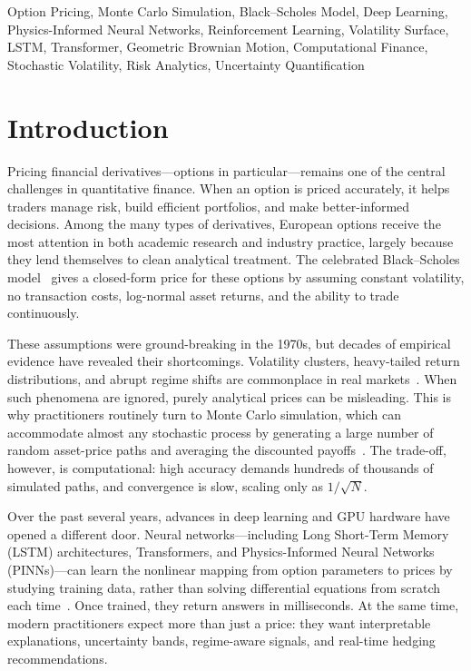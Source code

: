 \documentclass[conference]{IEEEtran}
\begin{document}
\begin{IEEEkeywords}
Option Pricing, Monte Carlo Simulation, Black--Scholes Model, Deep Learning, Physics-Informed Neural Networks, Reinforcement Learning, Volatility Surface, LSTM, Transformer, Geometric Brownian Motion, Computational Finance, Stochastic Volatility, Risk Analytics, Uncertainty Quantification
\end{IEEEkeywords}

\section{Introduction}

Pricing financial derivatives---options in particular---remains one of the central challenges in quantitative finance. When an option is priced accurately, it helps traders manage risk, build efficient portfolios, and make better-informed decisions. Among the many types of derivatives, European options receive the most attention in both academic research and industry practice, largely because they lend themselves to clean analytical treatment. The celebrated Black--Scholes model~\cite{b1} gives a closed-form price for these options by assuming constant volatility, no transaction costs, log-normal asset returns, and the ability to trade continuously.

These assumptions were ground-breaking in the 1970s, but decades of empirical evidence have revealed their shortcomings. Volatility clusters, heavy-tailed return distributions, and abrupt regime shifts are commonplace in real markets~\cite{b2,b3}. When such phenomena are ignored, purely analytical prices can be misleading. This is why practitioners routinely turn to Monte Carlo simulation, which can accommodate almost any stochastic process by generating a large number of random asset-price paths and averaging the discounted payoffs~\cite{b4}. The trade-off, however, is computational: high accuracy demands hundreds of thousands of simulated paths, and convergence is slow, scaling only as $1/\sqrt{N}$.

Over the past several years, advances in deep learning and GPU hardware have opened a different door. Neural networks---including Long Short-Term Memory (LSTM) architectures, Transformers, and Physics-Informed Neural Networks (PINNs)---can learn the nonlinear mapping from option parameters to prices by studying training data, rather than solving differential equations from scratch each time~\cite{b5,b6}. Once trained, they return answers in milliseconds. At the same time, modern practitioners expect more than just a price: they want interpretable explanations, uncertainty bands, regime-aware signals, and real-time hedging recommendations.
\end{document}
